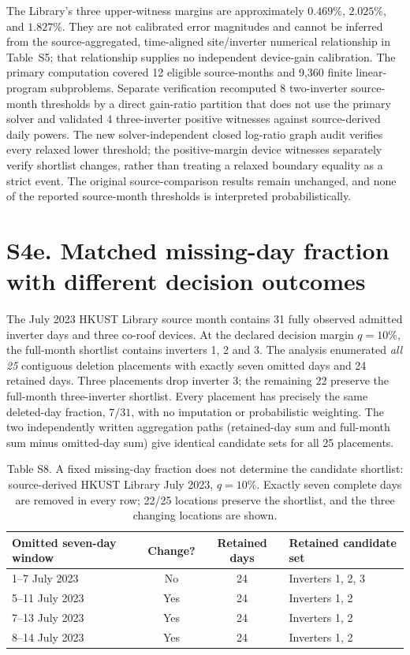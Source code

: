 \documentclass[11pt]{article}
\begin{document}
The Library's three upper-witness margins are approximately $0.469\%$, $2.025\%$, and $1.827\%$. They are not calibrated error magnitudes and cannot be inferred from the source-aggregated, time-aligned site/inverter numerical relationship in Table~S5; that relationship supplies no independent device-gain calibration. The primary computation covered 12 eligible source-months and 9,360 finite linear-program subproblems. Separate verification recomputed 8 two-inverter source-month thresholds by a direct gain-ratio partition that does not use the primary solver and validated 4 three-inverter positive witnesses against source-derived daily powers. The new solver-independent closed log-ratio graph audit verifies every relaxed lower threshold; the positive-margin device witnesses separately verify shortlist changes, rather than treating a relaxed boundary equality as a strict event. The original source-comparison results remain unchanged, and none of the reported source-month thresholds is interpreted probabilistically.

\section*{S4e. Matched missing-day fraction with different decision outcomes}

The July 2023 HKUST Library source month contains 31 fully observed admitted inverter days and three co-roof devices. At the declared decision margin $q=10\%$, the full-month shortlist contains inverters 1, 2 and 3. The analysis enumerated \emph{all 25} contiguous deletion placements with exactly seven omitted days and 24 retained days. Three placements drop inverter 3; the remaining 22 preserve the full-month three-inverter shortlist. Every placement has precisely the same deleted-day fraction, $7/31$, with no imputation or probabilistic weighting. The two independently written aggregation paths (retained-day sum and full-month sum minus omitted-day sum) give identical candidate sets for all 25 placements.

\begin{table}[ht]
\centering
\caption*{Table S8. A fixed missing-day fraction does not determine the candidate shortlist: source-derived HKUST Library July 2023, $q=10\%$. Exactly seven complete days are removed in every row; 22/25 locations preserve the shortlist, and the three changing locations are shown.}
\small
\begin{tabular}{lccp{5.5cm}}
\toprule
Omitted seven-day window & Change? & Retained days & Retained candidate set \\
\midrule
1--7 July 2023 & No & 24 & Inverters 1, 2, 3 \\
5--11 July 2023 & Yes & 24 & Inverters 1, 2 \\
7--13 July 2023 & Yes & 24 & Inverters 1, 2 \\
8--14 July 2023 & Yes & 24 & Inverters 1, 2 \\
\bottomrule
\end{tabular}
\end{table}
\end{document}
